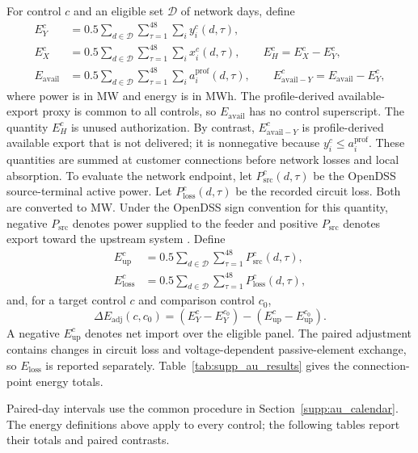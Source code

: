 \documentclass[11pt]{article}
\begin{document}
For control $c$ and an eligible set $\mathcal D$ of network days, define
\begin{align}
E_Y^c&=0.5\sum_{d\in\mathcal D}\sum_{\tau=1}^{48}\sum_i y_i^c(d,\tau),\nonumber\\
E_X^c&=0.5\sum_{d\in\mathcal D}\sum_{\tau=1}^{48}\sum_i x_i^c(d,\tau),\qquad
E_H^c=E_X^c-E_Y^c,\nonumber\\
E_{\mathrm{avail}}&=0.5\sum_{d\in\mathcal D}\sum_{\tau=1}^{48}\sum_i a_i^{\mathrm{prof}}(d,\tau),\qquad
E_{\mathrm{avail}-Y}^c=E_{\mathrm{avail}}-E_Y^c,
\label{eq:supp_au_energy_identity}
\end{align}
where power is in MW and energy is in MWh. The profile-derived available-export
proxy is common to all controls, so $E_{\mathrm{avail}}$ has no control
superscript. The quantity $E_H^c$ is unused authorization. By contrast,
$E_{\mathrm{avail}-Y}^c$ is profile-derived available export that is not
delivered; it is nonnegative because $y_i^c\le a_i^{\mathrm{prof}}$. These
quantities are summed at customer connections before network losses and local
absorption. To evaluate the network endpoint, let
$P_{\mathrm{src}}^c(d,\tau)$ be the OpenDSS source-terminal active power. Let
$P_{\mathrm{loss}}^c(d,\tau)$ be the recorded circuit loss. Both are converted
to MW.
Under the OpenDSS sign convention for this quantity, negative
$P_{\mathrm{src}}$ denotes power supplied to the feeder and positive
$P_{\mathrm{src}}$ denotes export toward the upstream system
\cite{epriOpenDSSTotalPower}. Define
\begin{align}
E_{\mathrm{up}}^c
&=0.5\sum_{d\in\mathcal D}\sum_{\tau=1}^{48}
P_{\mathrm{src}}^c(d,\tau),\nonumber\\
E_{\mathrm{loss}}^c
&=0.5\sum_{d\in\mathcal D}\sum_{\tau=1}^{48}
P_{\mathrm{loss}}^c(d,\tau),
\label{eq:supp_au_network_endpoint_energy}
\end{align}
and, for a target control $c$ and comparison control $c_0$,
\begin{equation}
\Delta E_{\mathrm{adj}}(c,c_0)
=\left(E_Y^c-E_Y^{c_0}\right)
-\left(E_{\mathrm{up}}^c-E_{\mathrm{up}}^{c_0}\right).
\label{eq:supp_au_network_adjustment}
\end{equation}
A negative $E_{\mathrm{up}}^c$ denotes net import over the eligible panel. The
paired adjustment contains changes in circuit loss and voltage-dependent
passive-element exchange, so $E_{\mathrm{loss}}$ is reported separately.
Table~\ref{tab:supp_au_results} gives the connection-point energy totals.

Paired-day intervals use the common procedure in
Section~\ref{supp:au_calendar}. The energy definitions above apply to every
control; the following tables report their totals and paired contrasts.
\end{document}
